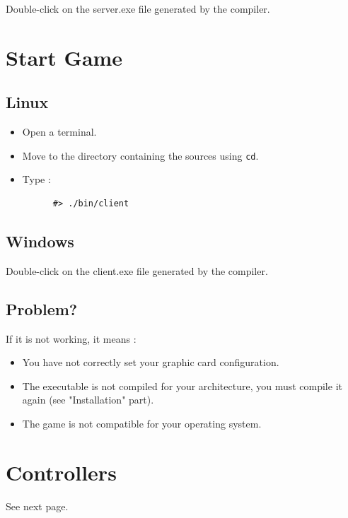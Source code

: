 \documentclass{koala-fr}
\begin{document}
Double-click on the server.exe file generated by the compiler.

\chapter{Start Game}

\section{Linux}

\begin{itemize}
  \item Open a terminal.
  \item Move to the directory containing the sources using \texttt{cd}.
  \item Type :
    \begin{lstlisting}
      #> ./bin/client
    \end{lstlisting}
\end{itemize}

\section{Windows}

Double-click on the client.exe file generated by the compiler.

\section{Problem?}

If it is not working, it means :
\begin{itemize}
  \item You have not correctly set your graphic card configuration.
  \item The executable is not compiled for your architecture, you must compile it again (see "Installation" part).
  \item The game is not compatible for your operating system.
\end{itemize}

\chapter{Controllers}
See next page.
\end{document}
